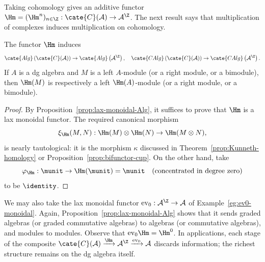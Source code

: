 Taking cohomology gives an additive functor
$\Hm=(\Hm^n)_{n\in\Z}:\cate{C}(\mathcal{A})\to\mathcal{A}^{\Z}$. The next
result says that multiplication of complexes induces multiplication on
cohomology.

\begin{proposition}\label{prop:Hm-lax-monoidal}
	The functor $\Hm$ induces
	\[ \cate{Alg}\left(\cate{C}(\mathcal{A})\right) \to \cate{Alg}\left(\mathcal{A}^{\Z}\right),
	\quad \cate{CAlg}\left(\cate{C}(\mathcal{A})\right) \to \cate{CAlg}\left(\mathcal{A}^{\Z}\right). \]
	If $A$ is a dg algebra and $M$ is a left $A$-module (or a right module, or
	a bimodule), then $\Hm(M)$ is respectively a left $\Hm(A)$-module (or a
	right module, or a bimodule).
\end{proposition}
\begin{proof}
	By Proposition~\ref{prop:lax-monoidal-Alg}, it suffices to prove that $\Hm$
	is a lax monoidal functor. The required canonical morphism
	\[ \xi_{\Hm}(M, N): \Hm(M) \otimes \Hm(N) \to \Hm(M \otimes N), \]
	is nearly tautological: it is the morphism $\kappa$ discussed in
	Theorem~\ref{prop:Kunneth-homology} or Proposition~\ref{prop:bifunctor-cup}.
	On the other hand, take
	\[ \varphi_{\Hm}: \munit \to \Hm(\munit) = \munit \quad \text{(concentrated in degree zero)} \]
	to be $\identity$.
\end{proof}

We may also take the lax monoidal functor
$\mathrm{ev}_0:\mathcal{A}^{\Z}\to\mathcal{A}$ of
Example~\ref{eg:ev0-monoidal}. Again, Proposition~\ref{prop:lax-monoidal-Alg}
shows that it sends graded algebras (or graded commutative algebras) to
algebras (or commutative algebras), and modules to modules. Observe that
$\mathrm{ev}_0\Hm=\Hm^0$. In applications, each stage of the composite
$\cate{C}(\mathcal{A})\xrightarrow{\Hm}\mathcal{A}^{\Z}
\xrightarrow{\mathrm{ev}_0}\mathcal{A}$ discards information; the richest
structure remains on the dg algebra itself.

